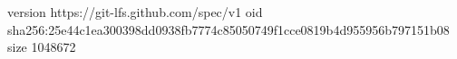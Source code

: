 version https://git-lfs.github.com/spec/v1
oid sha256:25e44c1ea300398dd0938fb7774c85050749f1cce0819b4d955956b797151b08
size 1048672
